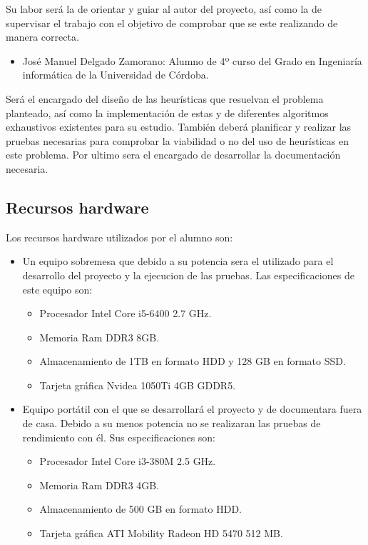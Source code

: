 \documentclass[a4paper, 12pt]{book}
\begin{document}
Su labor será la de orientar y guiar al autor del proyecto, así como la de supervisar el trabajo con el objetivo de comprobar que se este realizando de manera correcta.

\begin{itemize}

    \item José Manuel Delgado Zamorano: Alumno de 4º curso del Grado en Ingeniaría informática de la Universidad de Córdoba.
\end{itemize}
Será el encargado del diseño de las heurísticas que resuelvan el problema planteado, así como la implementación de estas y de diferentes algoritmos exhaustivos existentes para su estudio. También deberá planificar y realizar las pruebas necesarias para comprobar la viabilidad o no del uso de heurísticas en este problema. Por ultimo sera el encargado de desarrollar la documentación necesaria. 
    
\subsection{Recursos hardware}
Los recursos hardware utilizados por el alumno son:
\begin{itemize}
    \item Un equipo sobremesa que debido a su potencia sera el utilizado para el desarrollo del proyecto y la ejecucion de las pruebas. Las especificaciones de este equipo son:
        \begin{itemize}
        \item Procesador Intel Core i5-6400 2.7 GHz.
        \item Memoria Ram DDR3 8GB.
        \item Almacenamiento de 1TB en formato HDD y 128 GB en formato SSD.
        \item Tarjeta gráfica Nvidea 1050Ti 4GB GDDR5.
    \end{itemize}
    \newpage
    \item Equipo portátil con el que se desarrollará el proyecto y de documentara fuera de casa. Debido a su menos potencia no se realizaran las pruebas de rendimiento con él. Sus especificaciones son:
        \begin{itemize}
            \item Procesador Intel Core i3-380M 2.5 GHz.
            \item Memoria Ram DDR3 4GB.
            \item Almacenamiento de 500 GB en formato HDD.
            \item Tarjeta gráfica ATI Mobility Radeon HD 5470 512 MB.
    \end{itemize}
\end{itemize}
\end{document}
